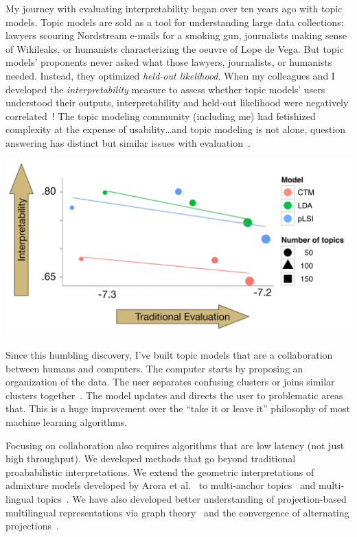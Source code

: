 My journey with evaluating interpretability began over ten years ago
with topic models.
%
Topic
models are sold as a tool for understanding large data collections: lawyers
scouring Nordstream e-mails for a smoking gun, journalists making sense of Wikileaks,
or humanists characterizing the oeuvre of Lope de Vega.
%
But topic models'
proponents never asked what those lawyers, journalists, or humanists
needed.
%
Instead, they optimized \emph{held-out likelihood}. When my colleagues
and I developed the \emph{interpretability} measure to assess whether topic
models' users understood their outputs, interpretability and
held-out likelihood were negatively correlated~\cite{chang-09b}!
%
The topic modeling community (including me) had fetishized complexity
at the expense of usability\dots and topic modeling is not alone,
question answering has distinct but similar issues with
evaluation~\cite{boyd-graber-20}.

\begin{center}
\includegraphics[width=.5\linewidth]{images/prec_ll_4}
\end{center}

Since this humbling discovery, I've built topic models that are a collaboration
between humans and computers.  The computer starts by proposing an organization
of the data.  The user separates confusing clusters or joins
similar clusters together~\cite{hu-14:itm}.  The model updates and directs the user to
problematic areas that.  This is a huge improvement over the
``take it or leave it'' philosophy of most machine learning algorithms.

Focusing on collaboration also requires algorithms that are low
latency (not just high throughput).  We developed methods that go
beyond traditional proababilistic interpretations. We extend the
geometric interpretations of admixture models developed by Arora et
al.~\cite{arora-12} to multi-anchor topics~\cite{lund-17} and
multi-lingual topics~\cite{Yuan-18}. We have also developed better
understanding of projection-based multilingual representations via
graph theory~\cite{Fujinuma-19} and the convergence of alternating
projections~\cite{Zhang-19}.

